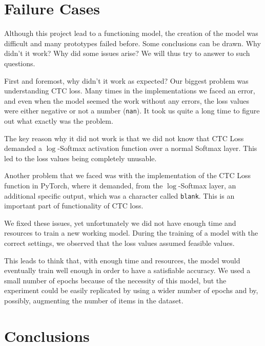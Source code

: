 \documentclass[11pt,journal]{IEEEtran}
\newcommand{\nl}{

\medskip

}
\begin{document}
\section{Failure Cases}

Although this project lead to a functioning model, the creation of the model was difficult and many prototypes failed before. Some conclusions can be drawn. Why didn't it work? Why did some issues arise? We will thus try to answer to such questions.

\nl
First and foremost, why didn't it work as expected? Our biggest problem was understanding CTC loss. Many times in the implementations we faced an error, and even when the model seemed the work without any errors, the loss values were either negative or not a number (\texttt{nan}). It took us quite a long time to figure out what exactly was the problem.

\nl
The key reason why it did not work is that we did not know that CTC Loss demanded a $\log$-Softmax activation function over a normal Softmax layer. This led to the loss values being completely unusable.

\nl
Another problem that we faced was with the implementation of the CTC Loss function in PyTorch, where it demanded, from the $\log$-Softmax layer, an additional specific output, which was a character called \texttt{blank}. This is an important part of functionality of CTC loss. 

\nl
We fixed these issues, yet unfortunately we did not have enough time and resources to train a new working model. During the training of a model with the correct settings, we observed that the loss values assumed feasible values. 

\nl
This leads to think that, with enough time and resources, the model would eventually train well enough in order to have a satisfiable accuracy. We used a small number of epochs because of the necessity of this model, but the experiment could be easily replicated by using a wider number of epochs and by, possibly, augmenting the number of items in the dataset.

\section{Conclusions}
\end{document}

